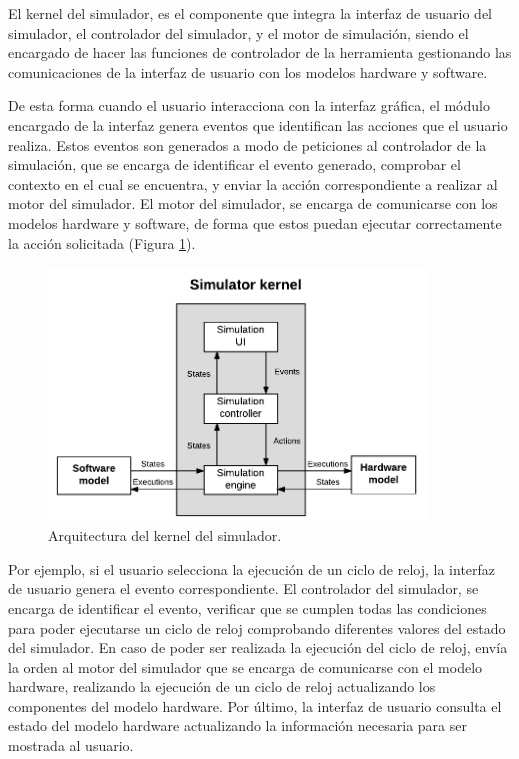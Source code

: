 El kernel del simulador, es el componente que integra la interfaz de usuario del simulador, el controlador del simulador, y el motor de simulación, siendo el encargado de hacer las funciones de controlador de la herramienta gestionando las comunicaciones de la interfaz de usuario con los modelos hardware y software. 

De esta forma cuando el usuario interacciona con la interfaz gráfica, el módulo encargado de la interfaz genera eventos que identifican las acciones que el usuario realiza. Estos eventos son generados a modo de peticiones al controlador de la simulación, que se encarga de identificar el evento generado, comprobar el contexto en el cual se encuentra, y enviar la acción correspondiente a realizar al motor del simulador. El motor del simulador, se encarga de comunicarse con los modelos hardware y software, de forma que estos puedan ejecutar correctamente la acción solicitada (Figura \ref{fig:kernel_diagram}).

\begin{figure}[htbp]
 	\centering
 	\includegraphics[width=10cm]{figures/kernel_diagram}
 	\caption{Arquitectura del kernel del simulador.}
	\label{fig:kernel_diagram}
\end{figure}

Por ejemplo, si el usuario selecciona la ejecución de un ciclo de reloj, la interfaz de usuario genera el evento correspondiente. El controlador del simulador, se encarga de identificar el evento, verificar que se cumplen todas las condiciones para poder ejecutarse un ciclo de reloj comprobando diferentes valores del estado del simulador. En caso de poder ser realizada la ejecución del ciclo de reloj, envía la orden al motor del simulador que se encarga de comunicarse con el  modelo hardware, realizando la ejecución de un ciclo de reloj actualizando los componentes del modelo hardware. Por último, la interfaz de usuario consulta el estado del modelo hardware actualizando la información necesaria para ser mostrada al usuario.




